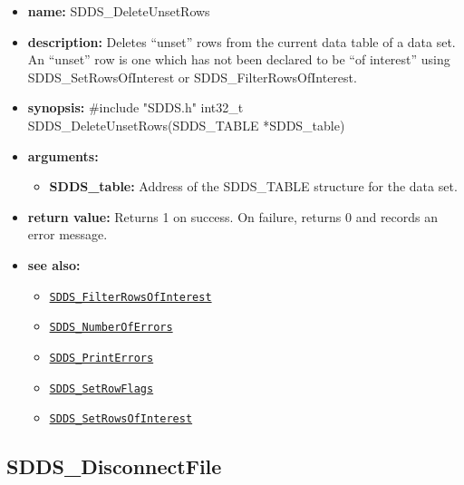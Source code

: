\documentclass[11pt]{article}
\newcommand{\progref}[1]{\hyperref[SDDS_#1]{\tt SDDS\_#1}}
\begin{document}
\begin{itemize}
\item {\bf name:}\newline
SDDS\_DeleteUnsetRows
\item {\bf description:}\newline
Deletes ``unset'' rows from the current data table of a data set. An ``unset'' row is one which has not been declared to be ``of interest'' using SDDS\_SetRowsOfInterest or SDDS\_FilterRowsOfInterest.
\item {\bf synopsis:} \#include "SDDS.h"\newline
int32\_t SDDS\_DeleteUnsetRows(SDDS\_TABLE *SDDS\_table)
\item {\bf arguments:}
\begin{itemize}
\item {\bf SDDS\_table:} Address of the SDDS\_TABLE structure for the data set.
\end{itemize}
\item {\bf return value:}\newline
Returns 1 on success. On failure, returns 0 and records an error message.
\item {\bf see also:}
\begin{itemize}
\item \progref{FilterRowsOfInterest}
\item \progref{NumberOfErrors}
\item \progref{PrintErrors}
\item \progref{SetRowFlags}
\item \progref{SetRowsOfInterest}
\end{itemize}
\end{itemize}

\subsection{SDDS\_DisconnectFile}
\label{SDDS_DisconnectFile}
\end{document}
